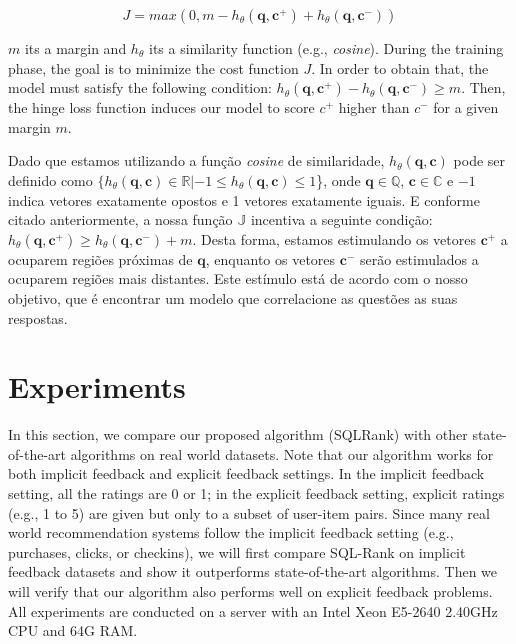 \documentclass[sigconf]{acmart}
\begin{document}
\begin{equation}
J = max(0, m - h_{\theta}(\bm{q}, \bm{c^{+}}) + h_{\theta}(\bm{q}, \bm{c^{-}}))
\end{equation}

$m$ its a margin and $h_{\theta}$ its a similarity function (e.g., \textit{cosine}). During the training phase, the goal is to minimize the cost function $J$. In order to obtain that, the model must satisfy the following condition: $h_{\theta}(\bm{q}, \bm{c^{+}}) - h_{\theta}(\bm{q}, \bm{c^{-}}) \geq m$. Then, the hinge loss function induces our model to score $c^{+}$ higher than $c^{-}$ for a given margin $m$. 

Dado que estamos utilizando a função \textit{cosine} de similaridade, $h_{\theta}(\bm{q}, \bm{c})$ pode ser definido como $\{h_{\theta}(\bm{q}, \bm{c}) \in \mathbb{R} | -1 \leq h_{\theta}(\bm{q}, \bm{c}) \leq 1$\}, onde $\bm{q} \in \mathbb{Q}$, $\bm{c} \in \mathbb{C}$ e $-1$ indica vetores exatamente opostos e 1 vetores exatamente iguais. E conforme citado anteriormente, a nossa função $\mathbb{J}$ incentiva a seguinte condição: $h_{\theta}(\bm{q}, \bm{c^{+}}) \geq h_{\theta}(\bm{q}, \bm{c^{-}}) + m$. Desta forma, estamos estimulando os vetores $\bm{c^{+}}$ a ocuparem regiões próximas de $\bm{q}$, enquanto os vetores $\bm{c^{-}}$ serão estimulados a ocuparem regiões mais distantes. Este estímulo está de acordo com o nosso objetivo, que é encontrar um modelo que correlacione as questões as suas respostas.

\section{Experiments}

In this section, we compare our proposed algorithm (SQLRank) with other state-of-the-art algorithms on real world datasets. Note that our algorithm works for both implicit
feedback and explicit feedback settings. In the implicit
feedback setting, all the ratings are 0 or 1; in the explicit
feedback setting, explicit ratings (e.g., 1 to 5) are given
but only to a subset of user-item pairs. Since many real
world recommendation systems follow the implicit feedback
setting (e.g., purchases, clicks, or checkins), we will first
compare SQL-Rank on implicit feedback datasets and show
it outperforms state-of-the-art algorithms. Then we will
verify that our algorithm also performs well on explicit
feedback problems. All experiments are conducted on a
server with an Intel Xeon E5-2640 2.40GHz CPU and 64G RAM.
\end{document}

